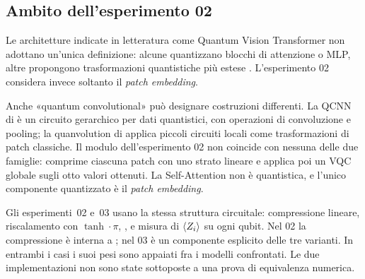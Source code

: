\subsection{Ambito dell'esperimento 02}
\label{ssec:precisazione-02}

Le architetture indicate in letteratura come Quantum Vision Transformer non
adottano un'unica definizione: alcune quantizzano blocchi di attenzione o MLP,
altre propongono trasformazioni quantistiche più estese
\parencite{cherrat2024quantumvision,comajoan2024qvt}. L'esperimento 02 considera
invece soltanto il \emph{patch embedding}.

Anche «quantum convolutional» può designare costruzioni differenti. La QCNN di
\textcite{cong2019qcnn} è un circuito gerarchico per dati quantistici, con
operazioni di convoluzione e pooling; la quanvolution di
\textcite{henderson2020quanvolutional} applica piccoli circuiti locali come
trasformazioni di patch classiche. Il modulo dell'esperimento 02 non coincide con
nessuna delle due famiglie: comprime ciascuna patch con uno strato lineare e
applica poi un VQC globale sugli otto valori ottenuti. La Self-Attention non è
quantistica, e l'unico componente quantizzato è il \emph{patch embedding}.

Gli esperimenti~02 e~03 usano la stessa struttura circuitale: compressione
lineare, riscalamento con $\tanh\cdot\pi$, ,
 e misura di $\langle Z_i \rangle$ su ogni qubit. Nel 02
la compressione è interna a ; nel 03 è un
componente esplicito delle tre varianti. In entrambi i casi i suoi pesi sono
appaiati fra i modelli confrontati. Le due implementazioni non sono state
sottoposte a una prova di equivalenza numerica.
